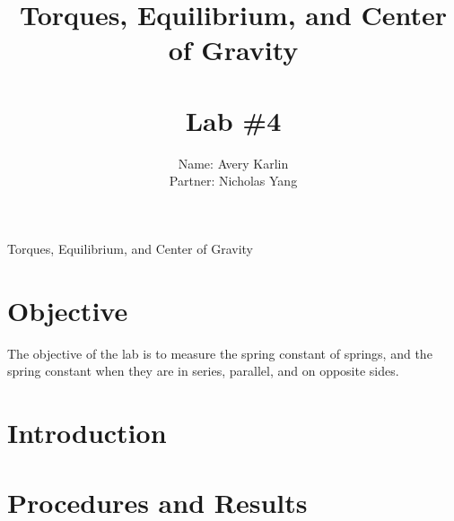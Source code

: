 \documentclass[11pt, titlepage]{article}
\title{Torques, Equilibrium, and Center of Gravity\\ \ \\ \large Lab \#4}
\author{Name: Avery Karlin \\ Partner: Nicholas Yang}
\date{}
\begin{document}
\maketitle

\begin{center}
\LARGE Torques, Equilibrium, and Center of Gravity
\end{center}

\section*{Objective}
The objective of the lab is to measure the spring constant of springs, and the spring constant when they are in series, parallel, and on opposite sides.
\section*{Introduction}

\section*{Procedures and Results}
\end{document}
